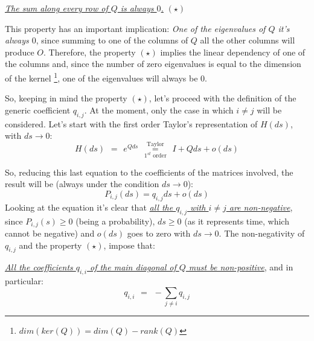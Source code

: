 \documentclass[12pt,a4paper]{article}
\begin{document}
\bigskip\noindent
\underline{\emph{The sum along every row of $Q$ is always $0$.}} \hspace{232pt} $(\star )$

\bigskip\noindent
This property has an important implication: 
\emph{One of the eigenvalues of $Q$ it's always $0$}, since summing to one of the columns of $Q$ all the other columns will produce $O$. Therefore, the property $(\star )$ implies the linear dependency of one of the columns and, since the number of zero eigenvalues is equal to the dimension of the kernel \footnote[2]{$dim(ker(Q))=dim(Q)-rank(Q)$}, one of the eigenvalues will always be $0$.

\bigskip\noindent
So, keeping in mind the property $(\star )$, let's proceed with the definition of the generic coefficient $q_{i,j}$. At the moment, only the case in which $i\neq j$ will be considered. Let's start with the first order Taylor's representation of $H(ds)$, with $ds\rightarrow 0$:
$$
H(ds) \hspace{5pt} =\hspace{5pt}e^{Qds}
\hspace{5pt}
\overset{\textrm{Taylor}}{\underset{1^{st}\textrm{ order}}{=}}
\hspace{5pt}
I+Qds+o(ds)
$$ 

\bigskip\noindent
So, reducing this last equation to the coefficients of the matrices involved, the result will be 
(always under the condition $ds\rightarrow 0$):
$$
P_{i,j}(ds)=q_{i,j}ds+o(ds)
$$
Looking at the equation it's clear that \underline{\emph{all the $q_{i,j}$ with $i\neq j$ are non-negative}}, since $P_{i,j}(s)\geq 0$ (being a probability), $ds\geq 0$ (as it represents time, which cannot be negative) and $o(ds)$ goes to zero with $ds\rightarrow 0$. 
\newpage
\noindent
The non-negativity of $q_{i,j}$ and the property $(\star )$, impose that:

\bigskip\noindent
\underline{\emph{All the coefficients $q_{i,i}$ of the main diagonal of $Q$ must be non-positive}}, and in particular:
$$
q_{i,i}
\hspace{5pt}=\hspace{5pt}-
\sum_{j\neq i}{q_{i,j}}
$$
\end{document}
